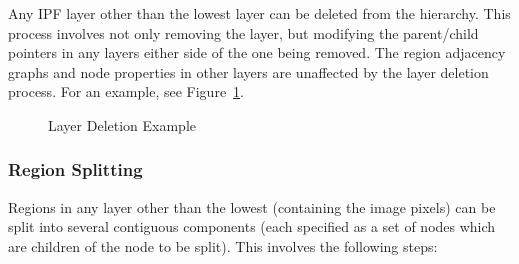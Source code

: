 Any IPF layer other than the lowest layer can be deleted from the hierarchy. This process involves not only removing the layer, but modifying the parent/child pointers in any layers either side of the one being removed. The region adjacency graphs and node properties in other layers are unaffected by the layer deletion process. For an example, see Figure~\ref{fig:ipfs-layerdeletion}.

\begin{figure}[H]
\begin{center}
	\hspace{4mm}%
\end{center}
\caption{Layer Deletion Example}
\label{fig:ipfs-layerdeletion}
\end{figure}

\subsubsection{Region Splitting}

Regions in any layer other than the lowest (containing the image pixels) can be split into several contiguous components (each specified as a set of nodes which are children of the node to be split). This involves the following steps:

